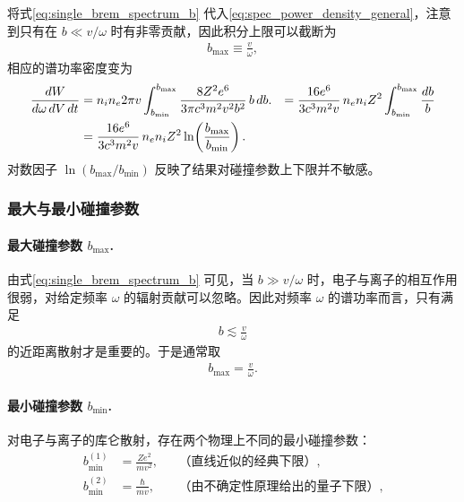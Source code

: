 将式\eqref{eq:single_brem_spectrum_b} 代入\eqref{eq:spec_power_density_general}，注意到只有在 $b\ll v/\omega$ 时有非零贡献，因此积分上限可以截断为
\begin{align}
  b_{\max} \equiv \frac{v}{\omega},
\end{align}
相应的谱功率密度变为
\begin{align}
  \frac{dW}{d\omega\,dV\,dt}
  &= n_i n_e 2\pi v
     \int_{b_{\min}}^{b_{\max}}
     \frac{8Z^{2}e^{6}}{3\pi c^{3}m^{2}v^{2}b^{2}}\,
     b\,db.
    &= \frac{16 e^{6}}{3 c^{3}m^{2}v}\,
       n_e n_i Z^{2}
       \int_{b_{\min}}^{b_{\max}}
       \frac{db}{b} \notag\\
    &= \frac{16 e^{6}}{3 c^{3}m^{2}v}\,
       n_e n_i Z^{2}
       \ln\!\left(\frac{b_{\max}}{b_{\min}}\right).
    \label{eq:spec_power_log}
\end{align}
  对数因子 $\ln(b_{\max}/b_{\min})$ 反映了结果对碰撞参数上下限并不敏感。

\subsubsection{最大与最小碰撞参数}

\paragraph{最大碰撞参数 $b_{\max}$.}

由式\eqref{eq:single_brem_spectrum_b} 可见，当 $b\gg v/\omega$ 时，电子与离子的相互作用很弱，对给定频率 $\omega$ 的辐射贡献可以忽略。因此对频率 $\omega$ 的谱功率而言，只有满足
\begin{align}
  b \lesssim \frac{v}{\omega}
\end{align}
的近距离散射才是重要的。于是通常取
\begin{align}
  b_{\max} = \frac{v}{\omega}.
  \label{eq:bmax_def}
\end{align}

\paragraph{最小碰撞参数 $b_{\min}$.}

  对电子与离子的库仑散射，存在两个物理上不同的最小碰撞参数：
  \begin{align}
    b_{\min}^{(1)} &= \frac{Z e^{2}}{m v^{2}},
    &&\text{（直线近似的经典下限）},\\
    b_{\min}^{(2)} &= \frac{\hbar}{m v},
    &&\text{（由不确定性原理给出的量子下限）},
  \end{align}

